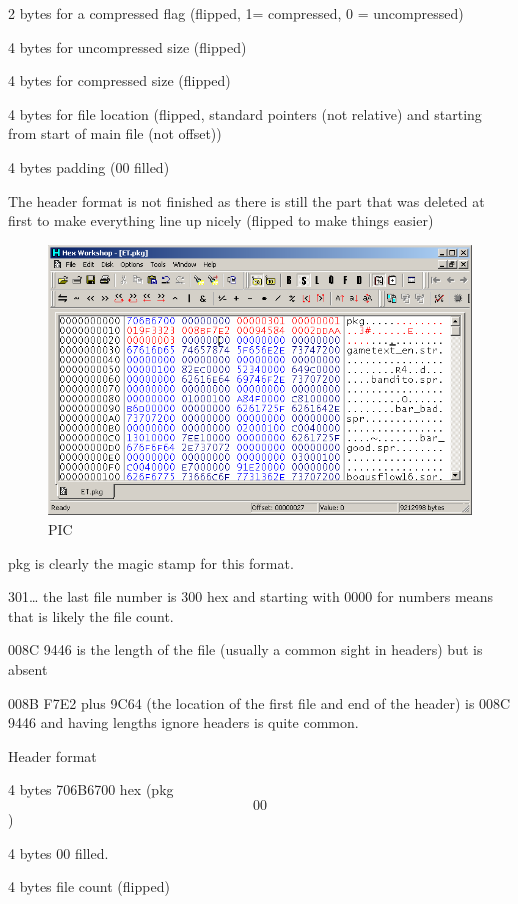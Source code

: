 \documentclass[
]{book}
\begin{document}
2 bytes for a compressed flag (flipped, 1= compressed, 0 = uncompressed)

4 bytes for uncompressed size (flipped)

4 bytes for compressed size (flipped)

4 bytes for file location (flipped, standard pointers (not relative) and starting from start of main file (not offset))

4 bytes padding (00 filled)

The header format is not finished as there is still the part that was deleted at first to make everything line up nicely (flipped to make things easier)

\begin{figure}
\centering
\includegraphics{images/131_home_fast6191_romhackingguide_unrenamed_fil___al_borders_romhackingguidearchive_eltigre_5.png}
\caption{PIC}
\end{figure}

pkg is clearly the magic stamp for this format.

301\ldots{} the last file number is 300 hex and starting with 0000 for numbers means that is likely the file count.

008C 9446 is the length of the file (usually a common sight in headers) but is absent

008B F7E2 plus 9C64 (the location of the first file and end of the header) is 008C 9446 and having lengths ignore headers is quite common.

Header format

4 bytes 706B6700 hex (pkg\[00\])

4 bytes 00 filled.

4 bytes file count (flipped)
\end{document}
